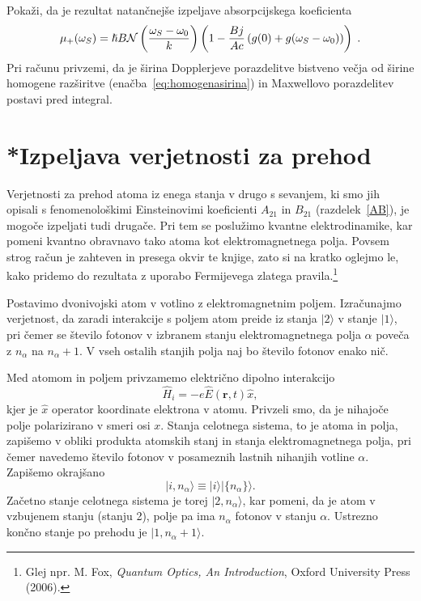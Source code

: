 \begin{naloga}
Pokaži, da je rezultat natančnejše izpeljave absorpcijskega koeficienta  
\begin{equation}
 \mu_{+}(\omega_S) = \hslash B{\cal N}\left(\frac{\omega_S-\omega_0}{k}\right)\left(1-\frac{Bj}
 {Ac}\left(g(0)+g(\omega_S-\omega_{0})\right)\right)\;.
\end{equation}
Pri računu privzemi, da je širina Dopplerjeve porazdelitve bistveno večja od širine homogene
razširitve (enačba~\ref{eq:homogenasirina}) in Maxwellovo porazdelitev postavi pred integral. 
\end{naloga}

\section{*Izpeljava verjetnosti za prehod}
\label{chap:verjetnost}
Verjetnosti za prehod atoma iz enega stanja v drugo s sevanjem, ki
smo jih opisali s fenomenološkimi Einsteinovimi koeficienti $A_{21}$
in $B_{21}$ (razdelek~\ref{AB}), 
je mogoče izpeljati tudi drugače.
Pri tem se poslužimo kvantne elektrodinamike, 
kar pomeni kvantno obravnavo 
tako atoma kot elektromagnetnega polja. Povsem strog račun je zahteven in presega
okvir te knjige, zato si na kratko oglejmo le, kako pridemo do rezultata z uporabo
Fermijevega zlatega pravila.\footnote{Glej npr. M. 
Fox, {\it Quantum Optics, An Introduction}, Oxford University Press (2006).}

Postavimo dvonivojski atom v votlino z elektromagnetnim poljem.
Izračunajmo verjetnost, da zaradi interakcije s poljem atom
preide iz stanja $|2\rangle$ v stanje $|1\rangle$, pri čemer se
število fotonov v izbranem stanju elektromagnetnega polja $\alpha$
poveča z $n_{\alpha}$ na $n_{\alpha}+1$. V vseh ostalih stanjih
polja naj bo število fotonov enako nič.

Med atomom in poljem privzamemo električno dipolno interakcijo 
\begin{equation}
\hat{H}_{i}=-e\hat{E}(\mathbf{r},t)\hat{x},
\label{4.47}
\end{equation}
kjer je $\hat{x}$ operator koordinate elektrona v atomu. 
Privzeli
smo, da je nihajoče polje polarizirano v smeri osi $x$. Stanja celotnega sistema, 
to je atoma in polja, zapišemo v obliki produkta atomskih stanj in
stanja elektromagnetnega polja, pri čemer navedemo število fotonov
v posameznih lastnih nihanjih votline $\alpha$. Zapišemo okrajšano
\begin{equation}
|i,n_{\alpha}\rangle\equiv|i\rangle|\{n_{\alpha}\}\rangle.
\label{4.48}
\end{equation}
Začetno stanje celotnega sistema je torej $|2,n_{\alpha}\rangle$, kar pomeni, da je
atom v vzbujenem stanju (stanju 2), polje pa ima $n_{\alpha}$ fotonov v stanju $\alpha$.
Ustrezno končno stanje po prehodu je $|1,n_{\alpha}+1\rangle$.

